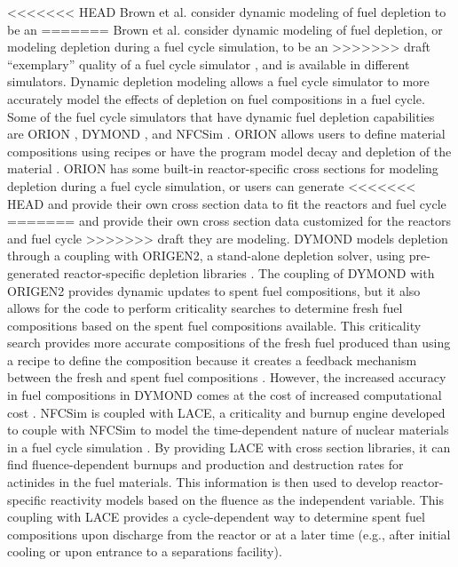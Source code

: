 <<<<<<< HEAD
Brown et al. consider dynamic modeling of fuel depletion to be an 
=======
Brown et al. consider dynamic modeling of fuel depletion, or 
modeling depletion during a fuel cycle simulation, to be an 
>>>>>>> draft
``exemplary'' quality 
of a fuel cycle simulator \cite{brown_identification_2016},
and is available in different simulators. Dynamic depletion 
modeling allows a fuel cycle simulator to more accurately model  
the effects of depletion on fuel compositions in a fuel cycle. Some of the 
fuel cycle simulators that have dynamic fuel depletion capabilities 
are ORION \cite{feng_standardized_2016}, \gls{DYMOND} 
\cite{richards_application_2021}, and \gls{NFCSim} \cite{schneider_nfcsim:_2005}.
ORION allows 
users to define material compositions using recipes or have the 
program model decay and depletion of the material \cite{sunny_transition_2015}. ORION 
has some built-in reactor-specific cross sections for modeling 
depletion during a fuel cycle simulation, or users can generate 
<<<<<<< HEAD
and provide their own cross section data to fit the reactors and fuel cycle 
=======
and provide their own cross section data customized for the reactors and fuel cycle 
>>>>>>> draft
they are modeling. \gls{DYMOND} models depletion through a coupling with 
ORIGEN2, a stand-alone depletion solver, using pre-generated 
reactor-specific depletion libraries \cite{richards_application_2021}.
The coupling of \gls{DYMOND} with ORIGEN2 provides dynamic updates to 
spent fuel compositions, but it also allows for the code to perform 
criticality searches to determine fresh fuel compositions based on 
the spent fuel compositions available. This criticality search provides 
more accurate compositions of the fresh fuel produced than using a recipe 
to define the composition because it creates a feedback mechanism 
between the fresh and spent fuel compositions \cite{richards_application_2021}.
However, the increased accuracy in fuel compositions in \gls{DYMOND} comes 
at the cost of increased computational cost \cite{richards_application_2021}.
\gls{NFCSim} is coupled with \gls{LACE}, a criticality and burnup 
engine developed to couple with \gls{NFCSim} to model the 
time-dependent nature of nuclear materials in a fuel cycle simulation
\cite{schneider_nfcsim:_2005}. By providing \gls{LACE} with cross 
section libraries, it can find fluence-dependent burnups and production 
and destruction rates for actinides in the fuel materials. This 
information is then used to develop reactor-specific reactivity models 
based on the fluence as the independent variable. This coupling 
with \gls{LACE} provides a cycle-dependent way to determine 
spent fuel compositions upon discharge from the reactor or at a 
later time (e.g., after initial cooling or upon entrance to a 
separations facility). 

